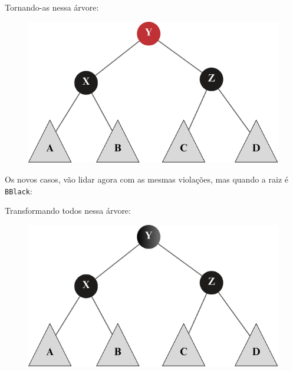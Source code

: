Tornando-as nessa árvore:

\begin{figure}[!ht]
	\centering
	\includegraphics[scale=0.5]{figures/rubro-negra/left-left-solution.png}
\end{figure}
\FloatBarrier

Os novos casos, vão lidar agora com as mesmas violações, mas quando a raiz é \texttt{BBlack}:

\begin{figure}[!ht]
	\centering
\end{figure}
\FloatBarrier

Transformando todos nessa árvore:

\begin{figure}[!ht]
	\centering
	\includegraphics[scale=0.5]{figures/rubro-negra/balance-removal-solution.png}
\end{figure}
\FloatBarrier

